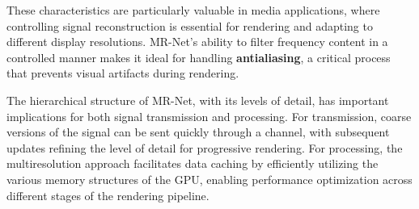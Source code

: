 These characteristics are particularly valuable in media applications, where controlling signal reconstruction is essential for rendering and adapting to different display resolutions. MR-Net's ability to filter frequency content in a controlled manner makes it ideal for handling \textbf{antialiasing}, a critical process that prevents visual artifacts during rendering.

The hierarchical structure of MR-Net, with its levels of detail, has important implications for both signal transmission and processing. For transmission, coarse versions of the signal can be sent quickly through a channel, with subsequent updates refining the level of detail for progressive rendering. For processing, the multiresolution approach facilitates data caching by efficiently utilizing the various memory structures of the GPU, enabling performance optimization across different stages of the rendering pipeline.




